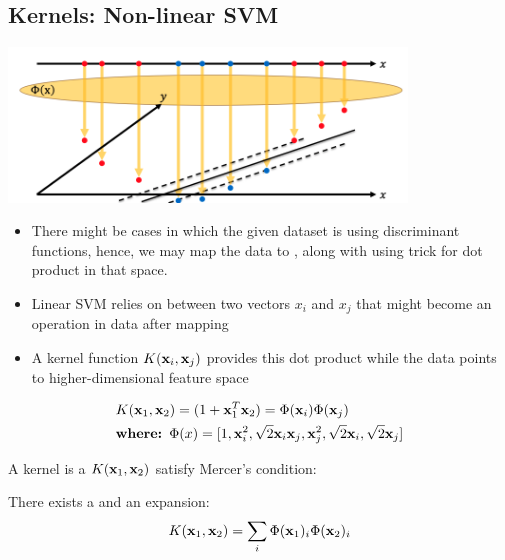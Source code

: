 \documentclass{tron}
\begin{document}
\subsection{Kernels: Non-linear SVM}
\begin{definition}{}
	\includegraphics[width=400px]{Figs/slide8/svm-nonlinear}
	
	\begin{itemize}
		\item There might be cases in which the given dataset is  using discriminant functions, hence, we may map the data to , along with using  trick for dot product in that space.
		\item Linear SVM relies on  between two vectors $x_i$ and $x_j$ that might become an  operation in  data after mapping
		\item A kernel function $K(\mathbf{x}_i,\mathbf{x}_j)$ provides this dot product while  the data points to higher-dimensional feature space
	\end{itemize}
	
	\begin{example}[]{}
		\begin{align}
			 & K(\mathbf{x}_1, \mathbf{x}_2) = (1 + \mathbf{x}_1^T \mathbf{x}_2) = \Phi(\mathbf{x}_i) \Phi(\mathbf{x}_j) \\
			 & \textbf{where: } \Phi(x) = [1, \mathbf{x}_i^2, \sqrt2 \mathbf{x}_i\mathbf{x}_j, \mathbf{x}_j^2, \sqrt2 \mathbf{x}_i, \sqrt2 \mathbf{x}_j]
		\end{align}
	\end{example}

	\begin{theorem}[Kernel]{}
		A kernel is a  $K(\mathbf{x}_1, \mathbf{x}_2)$ satisfy Mercer's condition:
		
		There exists a  and an expansion:
		\begin{equation}
			K(\mathbf{x}_1, \mathbf{x}_2) = \sum_i \Phi(\mathbf{x}_1)_i \Phi(\mathbf{x}_2)_i
		\end{equation}
		

\end{theorem}
\end{definition}
\end{document}
